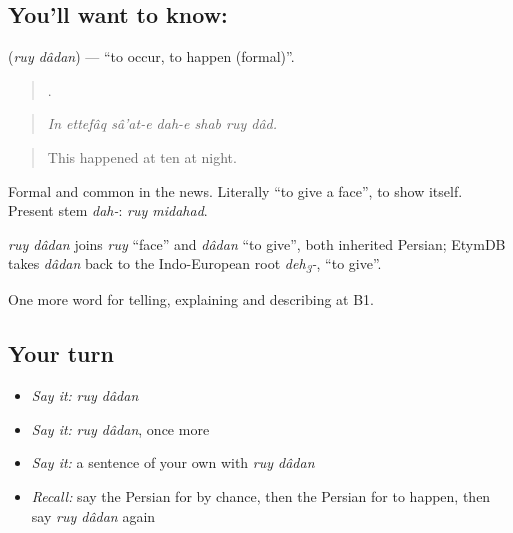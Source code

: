 \subsection*{You'll want to know:  }
\textbf{ } (\emph{ruy dâdan}) — \textquotedblleft{}to occur, to happen (formal)\textquotedblright{}.

\begin{quote}
      .
\end{quote}

\begin{quote}
\emph{In ettefâq sâ'at-e dah-e shab ruy dâd.}
\end{quote}

\begin{quote}
This happened at ten at night.
\end{quote}

Formal and common in the news. Literally \textquotedblleft{}to give a face\textquotedblright{}, to show itself. Present stem \emph{dah-}: \emph{ruy midahad}.

\begin{cousinweb}
\emph{ruy dâdan} joins \emph{ruy} \textquotedblleft{}face\textquotedblright{} and \emph{dâdan} \textquotedblleft{}to give\textquotedblright{}, both inherited Persian; EtymDB takes \emph{dâdan} back to the Indo-European root \emph{deh\textsubscript{3}-}, \textquotedblleft{}to give\textquotedblright{}.
\end{cousinweb}

\begin{grammarlens}[title={What you've built}]
One more word for telling, explaining and describing at B1.
\end{grammarlens}

\subsection*{Your turn}
\begin{itemize}
\raggedright
  \item \emph{Say it:} \emph{ruy dâdan}
  \item \emph{Say it:} \emph{ruy dâdan}, once more
  \item \emph{Say it:} a sentence of your own with \emph{ruy dâdan}
  \item \emph{Recall:} say the Persian for by chance, then the Persian for to happen, then say \emph{ruy dâdan} again
\end{itemize}

